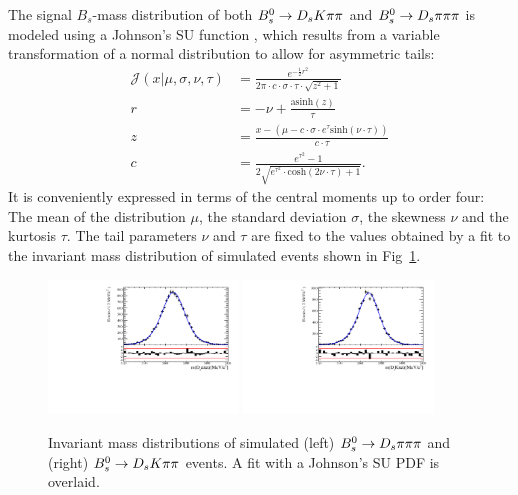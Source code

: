 The signal $B_s$-mass distribution of both ${{B}^0_{s}}\rightarrow{\ensuremath{{D}_{s}}}{\ensuremath{K}}{\ensuremath{\pi}}{\ensuremath{\pi}}$ and ${{B}^0_{s}}\rightarrow{\ensuremath{{D}_{s}}}{\ensuremath{\pi}}{\ensuremath{\pi}}{\ensuremath{\pi}}$  is modeled using a Johnson's SU function \cite{10.2307/2332539}, which 
results from a variable transformation of a normal distribution to allow for asymmetric tails:
\begin{align}
\mathcal J(x\vert\mu,\sigma,\nu,\tau) &=
\frac{e^{- \frac{1}{2} r^2}}{2\pi \cdot c \cdot \sigma \cdot \tau \cdot \sqrt{z^2+1}} \\
r &= - \nu + \frac{\text{asinh}(z)}{\tau} \\
z & = \frac{x-(\mu - c \cdot \sigma \cdot e^\tau \text{sinh}(\nu\cdot \tau))}{c \cdot \tau} \\
c &= \frac{e^{\tau^2}-1}{2\sqrt{e^{\tau^2} \cdot \text{cosh}(2 \nu \cdot \tau)+1}} .
\label{eq:RooJohnsonSU}
\end{align}
It is conveniently expressed in terms of the central moments up to order four: 
The mean of the distribution $\mu$, the standard deviation $\sigma$,
the skewness $\nu$ and the kurtosis $\tau$.
The tail parameters $\nu$ and $\tau$ are fixed to the values obtained by a fit to the invariant mass distribution of simulated events shown in Fig~\ref{fig: BsMassShapes}. 
\begin{figure}[h]
\centering
\includegraphics[height=!,width=0.45\textwidth]{figs/MassFit/normMC_pull.pdf} \hfill
\includegraphics[height=!,width=0.45\textwidth]{figs/MassFit/signalMC_pull.pdf}
\caption{Invariant mass distributions of simulated (left) ${{B}^0_{s}}\rightarrow{\ensuremath{{D}_{s}}}{\ensuremath{\pi}}{\ensuremath{\pi}}{\ensuremath{\pi}}$ and (right) ${{B}^0_{s}}\rightarrow{\ensuremath{{D}_{s}}}{\ensuremath{K}}{\ensuremath{\pi}}{\ensuremath{\pi}}$ events. A fit with a Johnson's SU PDF is overlaid.}
\label{fig: BsMassShapes}
\end{figure}
